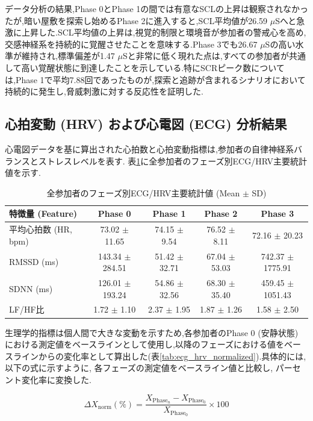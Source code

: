 \documentclass[book,paper=a4,fontsize=10pt,jafontscale=0.92]{jlreq}
\begin{document}
データ分析の結果,Phase 0とPhase 1の間では有意なSCLの上昇は観察されなかったが,暗い屋敷を探索し始めるPhase 2に進入すると,SCL平均値が26.59 $\mu$Sへと急激に上昇した.SCL平均値の上昇は,視覚的制限と環境音が参加者の警戒心を高め,交感神経系を持続的に覚醒させたことを意味する.Phase 3でも26.67 $\mu$Sの高い水準が維持され,標準偏差が1.47 $\mu$Sと非常に低く現れた点は,すべての参加者が共通して高い覚醒状態に到達したことを示している.特にSCRピーク数については,Phase 1で平均7.88回であったものが,探索と追跡が含まれるシナリオにおいて持続的に発生し,脅威刺激に対する反応性を証明した.

\subsection{心拍変動 (HRV) および心電図 (ECG) 分析結果}
心電図データを基に算出された心拍数と心拍変動指標は,参加者の自律神経系バランスとストレスレベルを表す. 表\ref{tab:ecg_hrv_stats}に全参加者のフェーズ別ECG/HRV主要統計値を示す.

\begin{table}[t]
\centering
\caption{全参加者のフェーズ別ECG/HRV主要統計値 (Mean $\pm$ SD)}
\label{tab:ecg_hrv_stats}
\begin{tabular}{lcccc}
\hline
特徴量 (Feature) & Phase 0 & Phase 1 & Phase 2 & Phase 3 \\
\hline
平均心拍数 (HR, bpm) & 73.02 $\pm$ 11.65 & 74.15 $\pm$ 9.54 & 76.52 $\pm$ 8.11 & 72.16 $\pm$ 20.23 \\
RMSSD (ms) & 143.34 $\pm$ 284.51 & 51.42 $\pm$ 32.71 & 67.04 $\pm$ 53.03 & 742.37 $\pm$ 1775.91 \\
SDNN (ms) & 126.01 $\pm$ 193.24 & 54.86 $\pm$ 32.56 & 68.30 $\pm$ 35.40 & 459.45 $\pm$ 1051.43 \\
LF/HF比 & 1.72 $\pm$ 1.10 & 2.37 $\pm$ 1.95 & 1.87 $\pm$ 1.26 & 1.58 $\pm$ 2.50 \\
\hline
\end{tabular}
\end{table}

生理学的指標は個人間で大きな変動を示すため,各参加者のPhase 0 (安静状態) における測定値をベースラインとして使用し,以降のフェーズにおける値をベースラインからの変化率として算出した(表\ref{tab:ecg_hrv_normalized}).具体的には, 以下の式に示すように, 各フェーズの測定値をベースライン値と比較し, パーセント変化率に変換した.


$$ \Delta X_{\mathrm{norm}} (\%) = \frac{X_{\mathrm{Phase}_n} - X_{\mathrm{Phase}_0}}{X_{\mathrm{Phase}_0}} \times 100 $$
\end{document}
